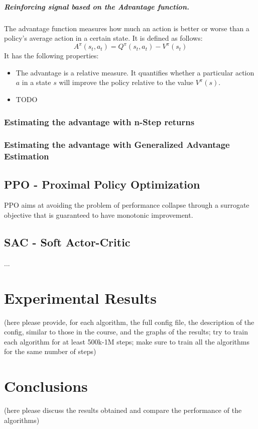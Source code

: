 \documentclass[12pt,a4paper]{report}
\begin{document}
			\paragraph{Reinforcing signal based on the Advantage function.}
			The advantage function measures how much an action is better or worse than a policy's average action in a certain state. It is defined as follows:
			\begin{equation}
			A^\pi(s_t, a_t) = Q^\pi(s_t, a_t) - V^\pi(s_t)
			\end{equation}
			It has the following properties:
			\begin{itemize}
				\item The advantage is a relative measure. It quantifies whether a particular action $a$ in a state $s$ will improve the policy relative to the value $V^\pi(s)$.
				\item TODO
			\end{itemize}
			\subsection{Estimating the advantage with n-Step returns}
			\subsection{Estimating the advantage with Generalized Advantage Estimation}
		\section{PPO - Proximal Policy Optimization}
		PPO aims at avoiding the problem of performance collapse through a surrogate objective that is guaranteed to have monotonic improvement. 
		\section{SAC - Soft Actor-Critic}
		...
	\chapter{Experimental Results}
	(here please provide, for each algorithm, the full config file, the description of the config, similar to those in the course, and the graphs of the results; try to train each algorithm for at least 500k-1M steps; make sure to train all the algorithms for the same number of steps)
	\chapter{Conclusions}
	(here please discuss the results obtained and compare the performance of the algorithms)
	
	
	
\end{document}
